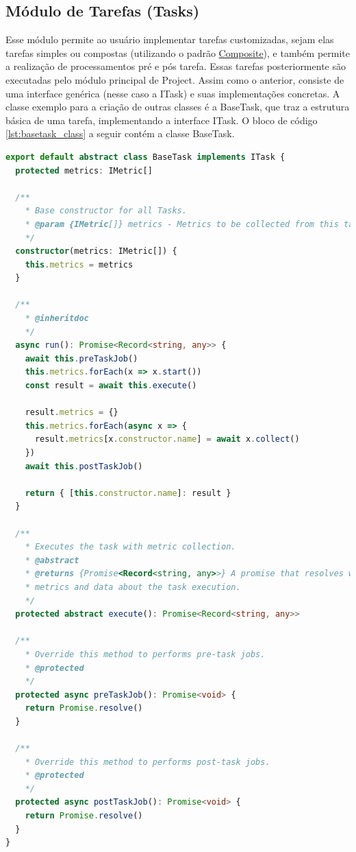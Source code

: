 \documentclass[12pt]{tcc}
\begin{document}
\subsection{Módulo de Tarefas (Tasks)}
\label{subsection:modulo-tasks}

Esse módulo permite ao usuário implementar tarefas customizadas, sejam elas tarefas simples ou compostas (utilizando o padrão \hyperref[subsection:composite]{Composite}), e também permite a realização de processamentos pré e pós tarefa. Essas tarefas posteriormente são executadas pelo módulo principal de Project.
Assim como o anterior, consiste de uma interface genérica (nesse caso a ITask) e suas implementações concretas. A classe exemplo para a criação de outras classes é a BaseTask, que traz a estrutura básica de uma tarefa, implementando a interface ITask. O bloco de código \ref{lst:basetask_class} a seguir contém a classe BaseTask.

\begin{lstlisting}[label={lst:basetask_class}, caption={Implementação da classe responsável por representar uma tarefa básica.}, language=TypeScript, breaklines=true]
export default abstract class BaseTask implements ITask {
  protected metrics: IMetric[]

  /**
    * Base constructor for all Tasks.
    * @param {IMetric[]} metrics - Metrics to be collected from this task.
    */
  constructor(metrics: IMetric[]) {
    this.metrics = metrics
  }

  /**
    * @inheritdoc
    */
  async run(): Promise<Record<string, any>> {
    await this.preTaskJob()
    this.metrics.forEach(x => x.start())
    const result = await this.execute()

    result.metrics = {}
    this.metrics.forEach(async x => {
      result.metrics[x.constructor.name] = await x.collect()
    })
    await this.postTaskJob()

    return { [this.constructor.name]: result }
  }

  /**
    * Executes the task with metric collection.
    * @abstract
    * @returns {Promise<Record<string, any>>} A promise that resolves with a report containing
    * metrics and data about the task execution.
    */
  protected abstract execute(): Promise<Record<string, any>>

  /**
    * Override this method to performs pre-task jobs.
    * @protected
    */
  protected async preTaskJob(): Promise<void> {
    return Promise.resolve()
  }

  /**
    * Override this method to performs post-task jobs.
    * @protected
    */
  protected async postTaskJob(): Promise<void> {
    return Promise.resolve()
  }
}
\end{lstlisting}
\end{document}

